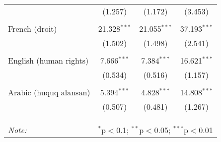 \begin{table}[!htbp]
\begin{tabular}{@{\extracolsep{5pt}}lccc}
  & (1.257) & (1.172) & (3.453) \\ 
  & & & \\ 
 French (droit) & 21.328$^{***}$ & 21.055$^{***}$ & 37.193$^{***}$ \\ 
  & (1.502) & (1.498) & (2.541) \\ 
  & & & \\ 
 English (human rights) & 7.666$^{***}$ & 7.384$^{***}$ & 16.621$^{***}$ \\ 
  & (0.534) & (0.516) & (1.157) \\ 
  & & & \\ 
 Arabic (huquq alansan) & 5.394$^{***}$ & 4.828$^{***}$ & 14.808$^{***}$ \\ 
  & (0.507) & (0.481) & (1.267) \\ 
  & & & \\ 
\hline \\[-1.8ex] 
\hline 
\hline \\[-1.8ex] 
\textit{Note:}  & \multicolumn{3}{r}{$^{*}$p$<$0.1; $^{**}$p$<$0.05; $^{***}$p$<$0.01} \\ 
\end{tabular} 
\end{table} 
